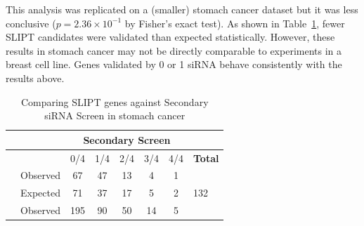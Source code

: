 This analysis was replicated on a (smaller) stomach cancer dataset but it was less conclusive ($p=2.36 \times 10^{-1}$ by Fisher's exact test). As shown in Table~\ref{tab:secondary_screen_stad}, fewer \gls{SLIPT} candidates were validated than expected statistically. However, these results in stomach cancer may not be directly comparable to experiments in a breast cell line. Genes validated by 0 or 1 \gls{siRNA} behave consistently with the results above.

\begin{table}[!ht]
\caption{Comparing \gls{SLIPT} genes against Secondary \gls{siRNA} Screen in stomach cancer}
\label{tab:secondary_screen_stad}
\begin{center}
\begin{tabular}{>{\cellcolor{white}}rrcccccl}
                                                                            &                                                           & \multicolumn{5}{c}{\bfseries Secondary Screen}                                                                                     &                                           \\ \cline{3-7}
\rowcolor{black!10}
                                                                            & \multicolumn{1}{r|}{\cellcolor{white}}                    & 0/4                      & 1/4                      & 2/4                     & 3/4                     & \multicolumn{1}{c|}{4/4} & \cellcolor{white} \textbf{Total}          \\ \cline{2-8} 
\rowcolor{black!5}
\multicolumn{1}{r|}{\cellcolor{white}}                                      & \multicolumn{1}{r|}{Observed}                             & 67                       & 47                       & 13                      & 4                       & \multicolumn{1}{c|}{1}   &  \multicolumn{1}{l|}{}                     \\
\rowcolor{black!10}
\multicolumn{1}{r|}{\cellcolor{white} \multirow{-2}{*}{\bfseries SLIPT$+$}} & \multicolumn{1}{r|}{Expected}                             & 71                       & 37                       & 17                      & 5                       & \multicolumn{1}{c|}{2}   & \multicolumn{1}{l|}{\multirow{-2}{*}{132}}    \\ \cline{2-8} 
\rowcolor{black!5}
\multicolumn{1}{r|}{\cellcolor{white}}                                      & \multicolumn{1}{r|}{Observed}                             & 195                      & 90                       & 50                      & 14                      & \multicolumn{1}{c|}{5}   & \multicolumn{1}{l|}{}                     \\

\end{tabular}
\end{center}
\end{table}
